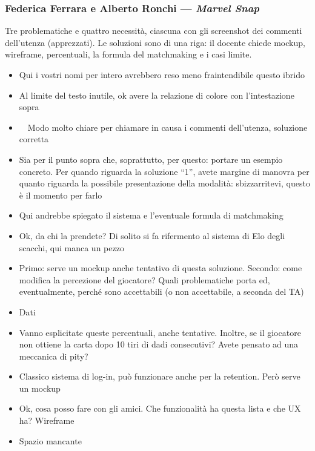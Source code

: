 \subsubsection{Federica Ferrara e Alberto Ronchi --- \emph{Marvel Snap}}
Tre problematiche e quattro necessità, ciascuna con gli screenshot dei
commenti dell'utenza (apprezzati). Le soluzioni sono di una riga: il docente
chiede mockup, wireframe, percentuali, la formula del matchmaking e i casi
limite.
{\small
\begin{itemize}
  \item {} Qui i vostri nomi per intero avrebbero reso meno fraintendibile questo ibrido
  \item {} Al limite del testo inutile, ok avere la relazione di colore con l'intestazione sopra
  \item \rvVuoto\ \rvBene\ Modo molto chiare per chiamare in causa i commenti dell'utenza, soluzione corretta
  \item {} Sia per il punto sopra che, soprattutto, per questo: portare un esempio concreto. Per quando riguarda la soluzione ``1'', avete margine di manovra per quanto riguarda la possibile presentazione della modalità: sbizzarritevi, questo è il momento per farlo
  \item {} Qui andrebbe spiegato il sistema e l'eventuale formula di matchmaking
  \item {} Ok, da chi la prendete? Di solito si fa rifermento al sistema di Elo degli scacchi, qui manca un pezzo
  \item {} Primo: serve un mockup anche tentativo di questa soluzione. Secondo: come modifica la percezione del giocatore? Quali problematiche porta ed, eventualmente, perché sono accettabili (o non accettabile, a seconda del TA)
  \item {} Dati
  \item {} Vanno esplicitate queste percentuali, anche tentative. Inoltre, se il giocatore non ottiene la carta dopo 10 tiri di dadi consecutivi? Avete pensato ad una meccanica di pity?
  \item {} Classico sistema di log-in, può funzionare anche per la retention. Però serve un mockup
  \item {} Ok, cosa posso fare con gli amici. Che funzionalità ha questa lista e che UX ha? Wireframe
  \item {} Spazio mancante
\end{itemize}
}

